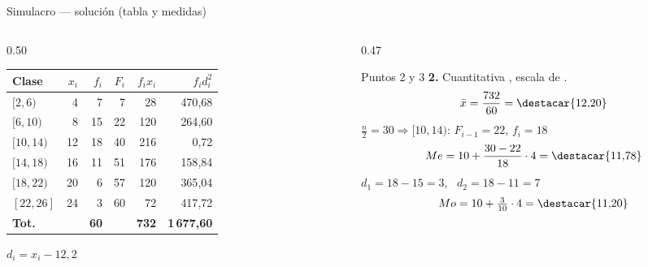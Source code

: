 \documentclass[aspectratio=169,10pt]{beamer}
\begin{document}
\begin{frame}{Simulacro — solución (tabla y medidas)}
  \scriptsize
  \begin{columns}[T,onlytextwidth]
    \begin{column}{0.50\textwidth}
      \centering
      \begin{tabular}{@{}lrrrrr@{}}
        \toprule
        \textbf{Clase} & \textbf{$x_i$} & \textbf{$f_i$} & \textbf{$F_i$} &
        \textbf{$f_ix_i$} & \textbf{$f_id_i^2$} \\
        \midrule
        $[2,6)$   &  4 &  7 &  7 &  28 & 470{,}68 \\
        $[6,10)$  &  8 & 15 & 22 & 120 & 264{,}60 \\
        $[10,14)$ & 12 & 18 & 40 & 216 &   0{,}72 \\
        $[14,18)$ & 16 & 11 & 51 & 176 & 158{,}84 \\
        $[18,22)$ & 20 &  6 & 57 & 120 & 365{,}04 \\
        $[22,26]$ & 24 &  3 & 60 &  72 & 417{,}72 \\
        \midrule
        \textbf{Tot.} & & \textbf{60} & & \textbf{732} &
        \textbf{1\,677{,}60} \\
        \bottomrule
      \end{tabular}
      {\tiny $d_i = x_i - 12{,}2$}
    \end{column}
    \begin{column}{0.47\textwidth}
      \begin{exampleblock}{Puntos 2 y 3}
        \scriptsize
        \textbf{2.} Cuantitativa , escala de .
        \[ \bar{x} = \frac{732}{60} = \destacar{12{,}20} \]
        $\frac{n}{2}=30 \Rightarrow [10,14)$: $F_{i-1}=22$, $f_i=18$
        \[ Me = 10+\frac{30-22}{18}\cdot4 = \destacar{11{,}78} \]
        $d_1=18-15=3$, \ $d_2=18-11=7$
        \[ Mo = 10+\tfrac{3}{10}\cdot4 = \destacar{11{,}20} \]
      \end{exampleblock}
    \end{column}
  \end{columns}
\end{frame}
\end{document}
